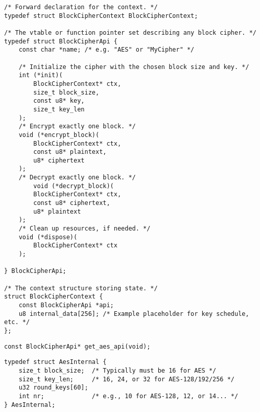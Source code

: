 %	
%	

\begin{lstlisting}[style=cstyle, caption={include/block\_cipher/block\_cipher.h}, captionpos=t]
/* Forward declaration for the context. */
typedef struct BlockCipherContext BlockCipherContext;

/* The vtable or function pointer set describing any block cipher. */
typedef struct BlockCipherApi {
	const char *name; /* e.g. "AES" or "MyCipher" */
	
	/* Initialize the cipher with the chosen block size and key. */
	int (*init)(
		BlockCipherContext* ctx,
		size_t block_size,
		const u8* key,
		size_t key_len
	);
	/* Encrypt exactly one block. */
	void (*encrypt_block)(
		BlockCipherContext* ctx,
		const u8* plaintext,
		u8* ciphertext
	);
	/* Decrypt exactly one block. */
		void (*decrypt_block)(
		BlockCipherContext* ctx,
		const u8* ciphertext,
		u8* plaintext
	);
	/* Clean up resources, if needed. */
	void (*dispose)(
		BlockCipherContext* ctx
	);
	
} BlockCipherApi;

/* The context structure storing state. */
struct BlockCipherContext {
	const BlockCipherApi *api;  
	u8 internal_data[256]; /* Example placeholder for key schedule, etc. */
};
\end{lstlisting}
\begin{lstlisting}[style=cstyle, caption={include/block\_cipher/block\_cipher\_aes.h}, captionpos=t]
const BlockCipherApi* get_aes_api(void);
\end{lstlisting}
\begin{lstlisting}[style=cstyle, caption={src/block\_cipher/block\_cipher\_aes.c}, captionpos=t]
typedef struct AesInternal {
	size_t block_size;  /* Typically must be 16 for AES */
	size_t key_len;     /* 16, 24, or 32 for AES-128/192/256 */
	u32 round_keys[60]; 
	int nr;             /* e.g., 10 for AES-128, 12, or 14... */
} AesInternal;
\end{lstlisting}

